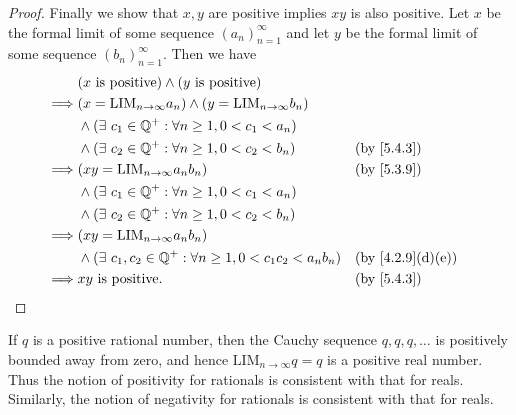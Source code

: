 \begin{proof}
  Finally we show that \(x, y\) are positive implies \(xy\) is also positive.
  Let \(x\) be the formal limit of some sequence \((a_n)_{n = 1}^{\infty}\) and let \(y\) be the formal limit of some sequence \((b_n)_{n = 1}^{\infty}\).
  Then we have
  \begin{align*}
             & (x \text{ is positive}) \land (y \text{ is positive})                                                             \\
    \implies & (x = \text{LIM}_{n \to \infty} a_n) \land (y = \text{LIM}_{n \to \infty} b_n)                                     \\
             & \land (\exists\ c_1 \in \Q^+ : \forall n \geq 1, 0 < c_1 < a_n)                                                   \\
             & \land (\exists\ c_2 \in \Q^+ : \forall n \geq 1, 0 < c_2 < b_n)               &  & \text{(by \cref{5.4.3})}       \\
    \implies & (xy = \text{LIM}_{n \to \infty} a_n b_n)                                      &  & \text{(by \cref{5.3.9})}       \\
             & \land (\exists\ c_1 \in \Q^+ : \forall n \geq 1, 0 < c_1 < a_n)                                                   \\
             & \land (\exists\ c_2 \in \Q^+ : \forall n \geq 1, 0 < c_2 < b_n)                                                   \\
    \implies & (xy = \text{LIM}_{n \to \infty} a_n b_n)                                                                          \\
             & \land (\exists\ c_1, c_2 \in \Q^+ : \forall n \geq 1, 0 < c_1 c_2 < a_n b_n)  &  & \text{(by \cref{4.2.9}(d)(e))} \\
    \implies & xy \text{ is positive}.                                                       &  & \text{(by \cref{5.4.3})}
  \end{align*}
\end{proof}

\begin{note}
  If \(q\) is a positive rational number, then the Cauchy sequence \(q, q, q, \dots\) is positively bounded away from zero, and hence \(\text{LIM}_{n \to \infty} q = q\) is a positive real number.
  Thus the notion of positivity for rationals is consistent with that for reals.
  Similarly, the notion of negativity for rationals is consistent with that for reals.
\end{note}

